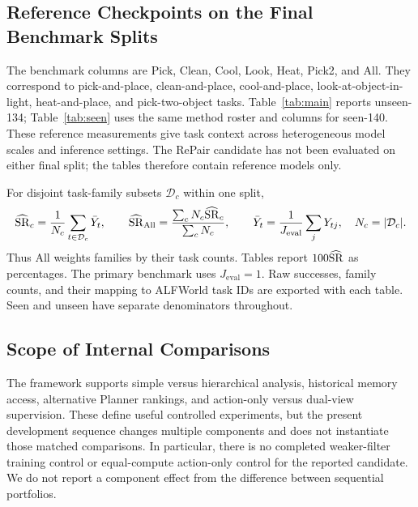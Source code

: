 \subsection{Reference Checkpoints on the Final Benchmark Splits}
\label{app:aggregation}
The benchmark columns are Pick, Clean, Cool, Look, Heat, Pick2, and All.
They correspond to pick-and-place, clean-and-place, cool-and-place,
look-at-object-in-light, heat-and-place, and pick-two-object tasks.
Table~\ref{tab:main} reports unseen-134; Table~\ref{tab:seen} uses the same
method roster and columns for seen-140. These reference measurements give
task context across heterogeneous model scales and inference settings.
The RePair candidate has not been evaluated on either final split;
the tables therefore contain reference models only.



For disjoint task-family subsets $\mathcal D_c$ within one split,
\begin{equation}
\widehat{\operatorname{SR}}_c=\frac{1}{N_c}\sum_{t\in\mathcal D_c}\bar Y_t,\qquad
\widehat{\operatorname{SR}}_{\mathrm{All}}=\frac{\sum_c N_c\widehat{\operatorname{SR}}_c}{\sum_c N_c},\qquad
\bar Y_t=\frac{1}{J_{\mathrm{eval}}}\sum_jY_{tj},\quad N_c=|\mathcal D_c|.
\label{eq:task-types}
\end{equation}
Thus All weights families by their task counts. Tables report
$100\widehat{\operatorname{SR}}$ as percentages. The primary benchmark uses
$J_{\mathrm{eval}}=1$. Raw successes, family counts, and their mapping to
ALFWorld task IDs are exported with each table. Seen and unseen have separate
denominators throughout.


\subsection{Scope of Internal Comparisons}
\label{app:comparisons}
The framework supports simple versus hierarchical analysis, historical
memory access, alternative Planner rankings, and action-only versus
dual-view supervision. These define useful controlled experiments, but
the present development sequence changes multiple components and does
not instantiate those matched comparisons. In particular, there is no
completed weaker-filter training control or equal-compute action-only
control for the reported candidate. We do not report a component effect
from the difference between sequential portfolios.

